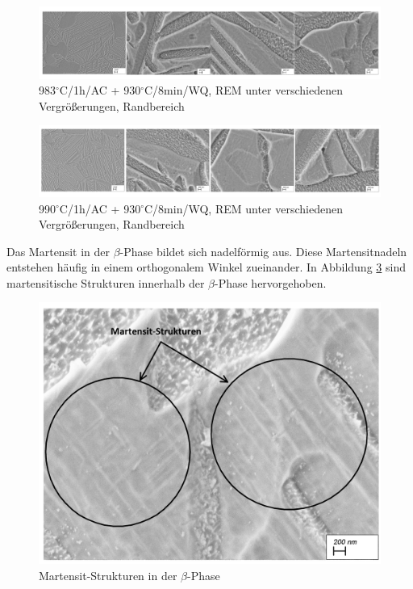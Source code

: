 \pagebreak

\begin{figure}[!]
	\centering
	\includegraphics[width=0.9\linewidth]{./Bilder/Abbildung 12}
	\caption[Abbildung 12]{983$^\circ$C/1h/AC + 930$^\circ$C/8min/WQ, REM unter verschiedenen Vergrößerungen, Randbereich}
	\label{fig:abbildung-12}
\end{figure}

\begin{figure}[!]
	\centering
	\includegraphics[width=0.9\linewidth]{./Bilder/Abbildung 13}
	\caption[Abbildung 13]{990$^\circ$C/1h/AC + 930$^\circ$C/8min/WQ, REM unter verschiedenen Vergrößerungen, Randbereich}
	\label{fig:abbildung-13}
\end{figure}

Das Martensit in der $\beta$-Phase bildet sich nadelförmig aus. Diese Martensitnadeln entstehen häufig in einem orthogonalem Winkel zueinander. In Abbildung \ref{fig:abbildung-21} sind martensitische Strukturen innerhalb der $\beta$-Phase hervorgehoben.

\begin{figure}[!]
	\centering
	\includegraphics[width=0.8\linewidth]{./Bilder/Abbildung 21}
	\caption[Abbildung]{Martensit-Strukturen in der $\beta$-Phase}
	\label{fig:abbildung-21}
\end{figure}

